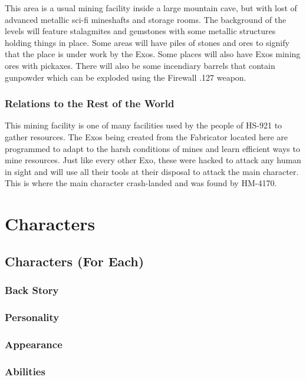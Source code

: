 \documentclass[12pt]{article}
\begin{document}
This area is a usual mining facility inside a large mountain cave, but with lost of advanced metallic sci-fi mineshafts and storage rooms. The background of the levels will feature stalagmites and gemstones with some metallic structures holding things in place. Some areas will have piles of stones and ores to signify that the place is under work by the Exos. Some places will also have Exos mining ores with pickaxes. There will also be some incendiary barrels that contain gunpowder which can be exploded using the Firewall .127 weapon. 

\subsubsection{Relations to the Rest of the World}

This mining facility is one of many facilities used by the people of HS-921 to gather resources. The Exos being created from the Fabricator located here are programmed to adapt to the harsh conditions of mines and learn efficient ways to mine resources. Just like every other Exo, these were hacked to attack any human in sight and will use all their tools at their disposal to attack the main character. This is where the main character crash-landed and was found by HM-4170.

\section{Characters}

\subsection{Characters (For Each)}

\subsubsection{Back Story}

\subsubsection{Personality}

\subsubsection{Appearance}

\subsubsection{Abilities}
\end{document}
